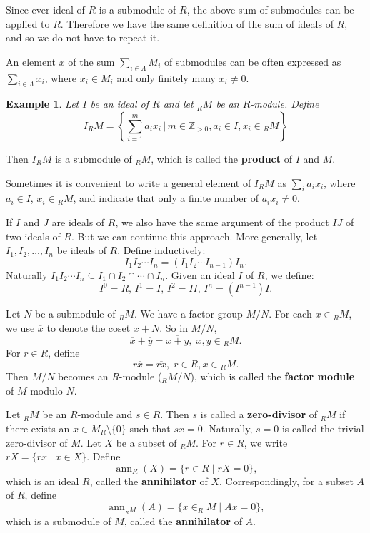 \documentclass[12pt,reqno]{amsart}
\theoremstyle{plain}
\newtheorem{rem}{Remark}
\DeclareMathOperator{\ann}{ann}
\newtheorem{ex}{Example}
\newcommand{\zz}{\mathbb Z}
\newcommand{\idealA}{\mathfrak{A}}
\begin{document}
Since ever ideal of $R$ is a submodule of $R$, the above sum of submodules can be applied to $R$.  Therefore we have the same definition of the sum of ideals of $R$, and so we do not have to repeat it. 

An element $x$ of the sum $\sum_{i \in \Lambda} M_i$ of submodules can be often expressed as $\sum_{i \in \Lambda} x_i$, where $x_i \in M_i$ and only finitely many $x_i \neq 0$.
\begin{ex} Let $I$ be an ideal of $R$ and let $_RM$ be an $R$-module.  Define \[ I {_RM} = \left \{ \sum_{i=1}^m a_i x_i \, \Big | \, m\in \zz_{>0}, a_i \in I, x_i \in {_RM} \right \} \]
\end{ex}
Then $I {_RM}$ is a submodule of $_RM$, which is called the \textbf{product} of $I$ and $M$.

Sometimes it is convenient to write a general element of $I {_RM}$ as $\sum_i a_i x_i$, where $a_i \in I$,  $x_i \in {_RM}$,  and indicate that only a finite number of $a_i x_i \neq 0 $. 

If $I$ and $J$ are ideals of $R$, we also have the same argument of the product $IJ$ of two ideals of $R$. But we can continue this approach.  More generally,  let $I_1, I_2, \ldots, I_n$ be ideals of $R$.  Define inductively: \[I_1 I_2 \cdots I_n = (I_1 I_2 \cdots I_{n-1}) I_n. \] Naturally $I_1 I_2 \cdots I_n \subseteq I_1 \cap I_2 \cap \cdots \cap I_n$.  Given an ideal $I$ of $R$, we define: \[I^0 = R, \, I^1 = I,  \, I^2 = I I , \, I^n = (I^{n-1}) I. \]

Let $N$ be a submodule of $_RM$. We have a factor group $M/N$.  For each $x \in {_RM}$, we use $\overline{x}$ to denote the coset $x + N$.  So in $M/N$,  \[\overline{x}+ \overline{y} = \overline{x+y}, \; x, y \in {_RM}. \]
For $ r \in R$, define \[ r\overline{x} = \overline{rx}, \; r \in R, x \in {_RM} .\]
Then $M/N$ becomes an $R$-module ($_R M/N$), which is called the \textbf{factor module} of $M$ modulo $N$. 

Let $_RM$ be an $R$-module and $s \in R$. Then $s$ is called a \textbf{zero-divisor} of $_RM$ if there exists an $x \in M_R \setminus \{ 0 \}$ such that $sx = 0$. Naturally, $s=0$ is called the trivial zero-divisor of $M$. Let $X$ be a subset of $_RM$. For $r \in R$, we write $rX = \{ rx \mid x \in X \}$.  Define \[ \ann_R (X) = \{ r \in R \mid rX = 0 \} ,\]which is an ideal $R$, called the \textbf{annihilator} of $X$. Correspondingly, for a subset $A$ of $R$, define \[ \ann_{_RM} (A) = \{ x \in _RM \mid Ax = 0 \}, \] which is a submodule of $M$, called the \textbf{annihilator} of $A$. 
\end{document}
